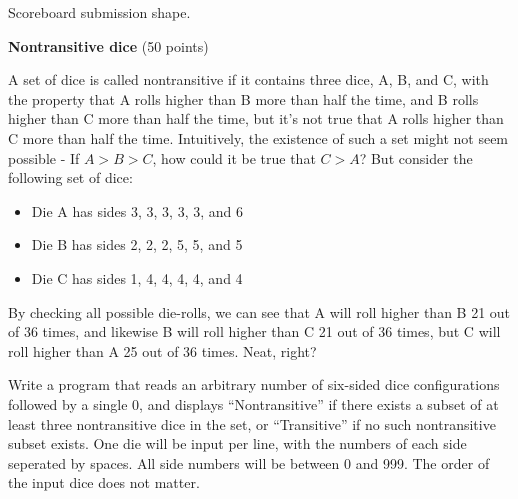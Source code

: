 \documentclass[11pt]{cselabheader}
\theoremstyle{plain}
\begin{document}
\begin{prob}[blocks.py]
\begin{center}

      Scoreboard submission shape.
    \end{center}
\end{prob}


\begin{prob}[dice.py]
    \textbf{Nontransitive dice} (50 points)


    A set of dice is called nontransitive if it contains three dice,
    A, B, and C, with the property that A rolls higher than B more
    than half the time, and B rolls higher than C more than half
    the time, but it's not true that A rolls higher than C more than
    half the time. Intuitively, the existence of such a set might not
    seem possible - If $A > B > C$, how could it be true that $C > A$?
    But consider the following set of dice:

    \begin{itemize}
      \item Die A has sides 3, 3, 3, 3, 3, and 6
      \item Die B has sides 2, 2, 2, 5, 5, and 5
      \item Die C has sides 1, 4, 4, 4, 4, and 4
    \end{itemize}
    By checking all possible die-rolls, we can see that A will roll
    higher than B 21 out of 36 times, and likewise B will roll higher
    than C 21 out of 36 times, but C will roll higher than A 25 out
    of 36 times. Neat, right?

    Write a program that reads an arbitrary number of six-sided dice
    configurations followed by a single 0, and displays
    ``Nontransitive'' if there exists a subset of at least three
    nontransitive dice in the set, or ``Transitive'' if no such
    nontransitive subset exists. One die will be input per line,
    with the numbers of each side seperated by spaces. All side
    numbers will be between 0 and 999. The order of the input dice
    does not matter.


\end{prob}
\end{document}
